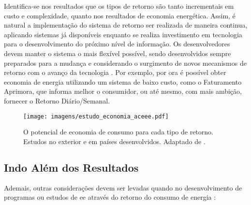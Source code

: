 Identifica-se nos resultados que os tipos de retorno são tanto incrementais
em custo e complexidade, quanto nos resultados de economia energética. Assim,
é natural a implementação do sistema de retorno ser realizada de
maneira continua, aplicando sistemas já disponíveis enquanto se realiza
investimento em tecnologia para o desenvolvimento do
próximo nível de informação. Os desenvolvedores devem
manter o sistema o mais flexível possível, sendo desenvolvidos
sempre preparados para a mudança e considerando o surgimento de novos
mecanismos de retorno com o avanço da tecnologia
\cite{aceee_2010_estudos_feedback}. Por exemplo, por ora é possível obter
economia de energia utilizando um sistema de baixo custo, como o Faturamento
Aprimora, que informa melhor o consumidor, ou até mesmo, com mais ambição,
fornecer o Retorno Diário/Semanal.

\begin{figure}[h!t]
\centering
\texttt{[image: imagens/estudo\_economia\_aceee.pdf]}
\caption[O potencial de consumo para cada tipo de retorno]
{O potencial de economia de consumo para cada tipo de retorno. Estudos
no exterior e em países desenvolvidos. Adaptado de
\cite{aceee_2010_estudos_feedback}.}
\label{fig:potencial_consumo_retorno}
\end{figure}


\subsection{Indo Além dos Resultados}
\label{ssec:ret_outros}

Ademais, outras considerações devem ser levadas quando no desenvolvimento
de programas ou estudos de \gls{ee} através do retorno do consumo de energia
\cite{aceee_2010_estudos_feedback,2006_darby,2009_epri}:

